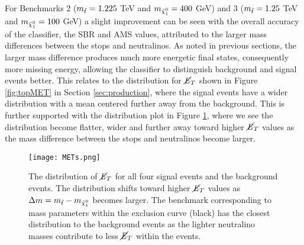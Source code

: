 For Benchmarks 2 ($m_{\Tilde{t}} = 1.225$ TeV and $m_{\Tilde{\chi}_1^0} = 400$ GeV) and 3 ($m_{\Tilde{t}} = 1.25$ TeV and $m_{\Tilde{\chi}_1^0} = 100$ GeV) a slight improvement can be seen with the overall accuracy of the classifier, the SBR and AMS values, attributed to the larger mass differences between the stops and neutralinos. As noted in previous sections, the larger mass difference produces much more energetic final states, consequently more missing energy, allowing the classifier to distinguish background and signal events better. This relates to the distribution for $\cancel{\it{E}}_{T}$ shown in Figure \ref{fig:topMET} in Section \ref{sec:production}, where the signal events have a wider distribution with a mean centered further away from the background. This is further supported with the distribution plot in Figure \ref{fig:METs}, where we see the distribution become flatter, wider and further away toward higher $\cancel{\it{E}}_{T}$ values as the mass difference between the stops and neutralinos become larger. \\


\begin{figure}[htbp]
    \centering
    \texttt{[image: METs.png]}
    \caption{The distribution of $\cancel{\it{E}}_{T}$ for all four signal events and the background events. The distribution shifts toward higher $\cancel{\it{E}}_{T}$ values as $\Delta m = m_{\Tilde{t}} - m_{\Tilde{\chi}_1^0}$ becomes larger. The benchmark corresponding to mass parameters within the exclusion curve (black) has the closest distribution to the background events as the lighter neutralino masses contribute to less $\cancel{\it{E}}_{T}$ within the events.}
    \label{fig:METs}
\end{figure}
\hfill\break
\hfill\break

